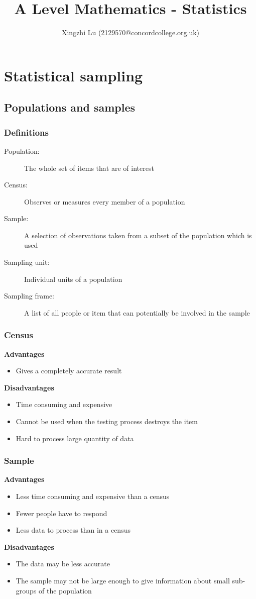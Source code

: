 \documentclass[A4paper]{article}
\title{A Level Mathematics - Statistics}
\author{Xingzhi Lu (2129570@concordcollege.org.uk)}
\begin{document}
	\maketitle
	\section{Statistical sampling}
	\subsection{Populations and samples}
	\subsubsection{Definitions}
	\begin{description}
		\item[Population:] The whole set of items that are of interest
		\item[Census:] Observes or measures every member of a population
		\item[Sample:] A selection of observations taken from a subset of the population which is used
		\item[Sampling unit:] Individual units of a population
		\item[Sampling frame:] A list of all people or item that can potentially be involved in the sample
	\end{description}
	
	\subsubsection{Census}
	\textbf{Advantages}
	\begin{itemize}
		\item Gives a completely accurate result
	\end{itemize}
	\textbf{Disadvantages}
	\begin{itemize}
		\item Time consuming and expensive
		\item Cannot be used when the testing process destroys the item
		\item Hard to process large quantity of data
	\end{itemize}
	\subsubsection{Sample}
	\textbf{Advantages}
	\begin{itemize}
		\item Less time consuming and expensive than a census
		\item Fewer people have to respond
		\item Less data to process than in a census
	\end{itemize}
	\textbf{Disadvantages}
	\begin{itemize}
		\item The data may be less accurate
		\item The sample may not be large enough to give information about small sub-groups of the population
	\end{itemize}
	
\end{document}
